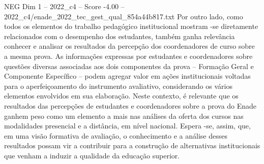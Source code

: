 \begin{textsample}{NEG Dim 1 – 2022\_c4 – Score -4.00 – 2022\_c4/enade\_2022\_tec\_gest\_qual\_854a44b817.txt}
Por outro lado, como todos os elementos do trabalho pedagógico institucional mostram -se diretamente relacionados com o desempenho dos estudantes, também ganha relevância conhecer e analisar os resultados da percepção dos coordenadores de curso sobre a mesma prova.
As informações expressas por estudantes e coordenadores sobre questões diversas associadas aos dois componentes da prova – Formação Geral e Componente Específico – podem agregar valor em ações institucionais voltadas para o aperfeiçoamento do instrumento avaliativo, considerando os vários elementos envolvidos em sua elaboração.
Neste contexto, é relevante que os resultados das percepções de estudantes e coordenadores sobre a prova do Enade ganhem peso como um elemento a mais nas análises da oferta dos cursos nas modalidades presencial e a distância, em nível nacional.
Espera -se, assim, que, em uma visão formativa de avaliação, o conhecimento e a análise desses resultados possam vir a contribuir para a construção de alternativas institucionais que venham a induzir a qualidade da educação superior.

\end{textsample}

